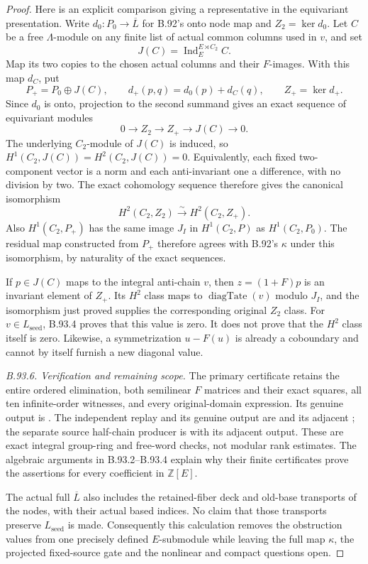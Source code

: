 \begin{proof}
Here is an explicit comparison giving a representative in the
equivariant presentation. Write $d_0:P_0\to\overline L$ for
B.92's onto node map and $Z_2=\ker d_0$. Let $C$ be a free
$\Lambda$-module on any finite list of actual common columns
used in $v$, and set
\[
 J(C)=\operatorname{Ind}_{E}^{E\rtimes C_2}C.
\]
Map its two copies to the chosen actual columns and their
$F$-images. With this map $d_C$, put
\[
 P_+=P_0\oplus J(C),\qquad
 d_+(p,q)=d_0(p)+d_C(q),\qquad Z_+=\ker d_+.
\]
Since $d_0$ is onto, projection to the second summand gives
an exact sequence of equivariant modules
\begin{equation}\label{eq:B93-refinement}
 0\longrightarrow Z_2\longrightarrow Z_+
      \longrightarrow J(C)\longrightarrow0.
\end{equation}
The underlying $C_2$-module of $J(C)$ is induced, so
$H^1(C_2,J(C))=H^2(C_2,J(C))=0$. Equivalently, each fixed
two-component vector is a norm and each anti-invariant one a
difference, with no division by two. The exact cohomology
sequence therefore gives the canonical isomorphism
\[
                   H^2(C_2,Z_2)\xrightarrow{\sim}H^2(C_2,Z_+).
\]
Also $H^1(C_2,P_+)$ has the same image $J_I$ in $H^1(C_2,P)$
as $H^1(C_2,P_0)$. The residual map constructed from $P_+$
therefore agrees with B.92's $\kappa$ under this isomorphism,
by naturality of the exact sequences.

If $p\in J(C)$ maps to the integral anti-chain $v$, then
$z=(1+F)p$ is an invariant element of $Z_+$. Its $H^2$ class
maps to $\operatorname{diagTate}(v)$ modulo $J_I$, and the
isomorphism just proved supplies the corresponding original
$Z_2$ class. For $v\in L_{\mathrm{seed}}$, B.93.4 proves
that this value is zero. It does not prove that the $H^2$ class
itself is zero. Likewise, a symmetrization $u-F(u)$ is already
a coboundary and cannot by itself furnish a new diagonal value.

\emph{B.93.6. Verification and remaining scope.}
The primary certificate retains the entire ordered elimination,
both semilinear $F$ matrices and their exact squares, all ten
infinite-order witnesses, and every original-domain expression.
Its genuine output is .
The independent replay and its genuine output are
and its adjacent ; the separate source half-chain
producer is
with its adjacent output. These are exact integral group-ring
and free-word checks, not modular rank estimates. The algebraic
arguments in B.93.2--B.93.4 explain why their finite certificates
prove the assertions for every coefficient in $\mathbb Z[E]$.

The actual full $\overline L$ also includes the retained-fiber
deck and old-base transports of the nodes, with their actual
based indices. No claim that those transports preserve
$L_{\mathrm{seed}}$ is made. Consequently this calculation
removes the obstruction values from one precisely defined
$E$-submodule while leaving the full map $\kappa$, the projected
fixed-source gate and the nonlinear and compact questions open.
\end{proof}
